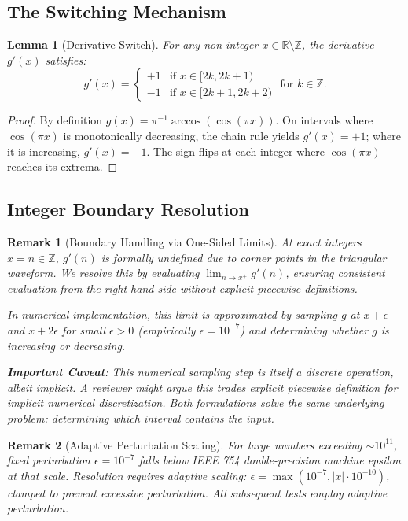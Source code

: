 \documentclass[12pt, a4paper]{article}
\theoremstyle{note}
\newtheorem{lemma}[theorem]{Lemma}
\newtheorem{remark}{Remark}[section]
\newcommand{\Real}{\mathbb{R}}
\newcommand{\Int}{\mathbb{Z}}
\begin{document}
\subsection{The Switching Mechanism}

\begin{lemma}[Derivative Switch]\label{lem:switch}
For any non-integer $x \in \Real \setminus \Int$, the derivative $g'(x)$ satisfies:
\[
g'(x) = 
\begin{cases} 
+1 & \text{if } x \in [2k, 2k+1) \\
-1 & \text{if } x \in [2k+1, 2k+2)
\end{cases} \text{ for } k \in \Int.
\]
\end{lemma}

\begin{proof}
By definition $g(x) = \pi^{-1}\arccos(\cos(\pi x))$. On intervals where $\cos(\pi x)$ is monotonically decreasing, the chain rule yields $g'(x) = +1$; where it is increasing, $g'(x) = -1$. The sign flips at each integer where $\cos(\pi x)$ reaches its extrema.
\end{proof}

\subsection{Integer Boundary Resolution}

\begin{remark}[Boundary Handling via One-Sided Limits]\label{rem:boundary}
At exact integers $x = n \in \Int$, $g'(n)$ is formally undefined due to corner points in the triangular waveform. We resolve this by evaluating $\lim_{n \to x^+} g'(n)$, ensuring consistent evaluation from the right-hand side without explicit piecewise definitions.

In numerical implementation, this limit is approximated by sampling $g$ at $x + \epsilon$ and $x + 2\epsilon$ for small $\epsilon > 0$ (empirically $\epsilon = 10^{-7}$) and determining whether $g$ is increasing or decreasing.

\textbf{Important Caveat}: This numerical sampling step is itself a discrete operation, albeit implicit. A reviewer might argue this trades explicit piecewise definition for implicit numerical discretization. Both formulations solve the same underlying problem: determining which interval contains the input.
\end{remark}

\begin{remark}[Adaptive Perturbation Scaling]\label{rem:adaptive_eps}
For large numbers exceeding $\sim 10^{11}$, fixed perturbation $\epsilon = 10^{-7}$ falls below IEEE 754 double-precision machine epsilon at that scale. Resolution requires adaptive scaling: $\epsilon = \max(10^{-7}, |x| \cdot 10^{-10})$, clamped to prevent excessive perturbation. All subsequent tests employ adaptive perturbation.
\end{remark}
\end{document}

